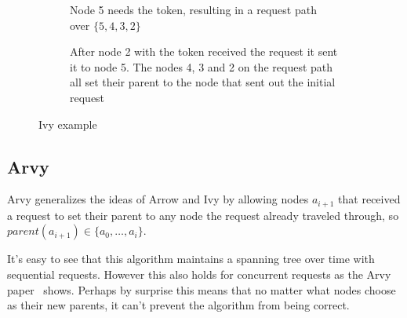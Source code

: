 \documentclass[a4paper, oneside]{discothesis}
\begin{document}
\begin{figure}[]
\begin{subfigure}[t]{0.5\textwidth}
\centering
{}
\caption{Node 5 needs the token, resulting in a request path over $\{5,4,3,2\}$}
\end{subfigure}
\quad
\begin{subfigure}[t]{0.5\textwidth}
\centering
{}
\caption{After node 2 with the token received the request it sent it to node 5. The nodes 4, 3 and 2 on the request path all set their parent to the node that sent out the initial request}
\end{subfigure}
\caption{Ivy example}
\label{fig:ivy}
\end{figure}

\subsection{Arvy}

Arvy generalizes the ideas of Arrow and Ivy by allowing nodes $a_{i+1}$ that received a request to set their parent to any node the request already traveled through, so $parent(a_{i+1})\in\{a_0,\dots,a_i\}$.

It's easy to see that this algorithm maintains a spanning tree over time with sequential requests. However this also holds for concurrent requests as the Arvy paper~\cite{Arvy} shows. Perhaps by surprise this means that no matter what nodes choose as their new parents, it can't prevent the algorithm from being correct.
\end{document}

